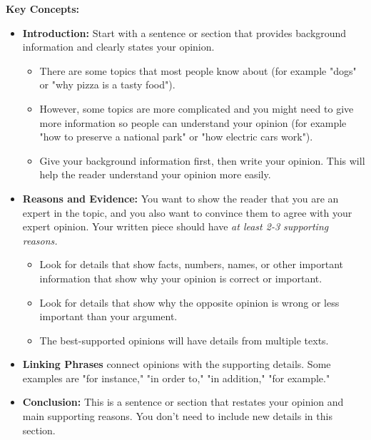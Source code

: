 \documentclass[12pt]{article}
\begin{document}
\begin{tcolorbox}[colframe=black!60, colback=white, 
coltitle=black, colbacktitle=black!15, fonttitle=\bfseries\Large, 
title=Key Concepts and Vocabulary, halign title=center, left=10pt, right=10pt, top=10pt, bottom=5pt]
\textbf{Key Concepts:}
\begin{itemize}
    \item \textbf{Introduction:} Start with a sentence or section that provides background information and clearly states your opinion.
    \begin{itemize}
        \item There are some topics that most people know about (for example "dogs" or "why pizza is a tasty food").   
        \item However, some topics are more complicated and you might need to give more information so people can understand your opinion (for example "how to preserve a national park" or "how electric cars work").
        \item Give your background information first, then write your opinion. This will help the reader understand your opinion more easily.
    \end{itemize}

    \item \textbf{Reasons and Evidence:} You want to show the reader that you are an expert in the topic, and you also want to convince them to agree with your expert opinion. Your written piece should have \textit{at least 2-3 supporting reasons.}
    \begin{itemize}
        \item Look for details that show facts, numbers, names, or other important information that show why your opinion is correct or important.
        \item Look for details that show why the opposite opinion is wrong or less important than your argument.
        \item The best-supported opinions will have details from multiple texts.
    \end{itemize}
    \item \textbf{Linking Phrases} connect opinions with the supporting details. Some examples are "for instance," "in order to," "in addition," "for example."
    \item \textbf{Conclusion:} This is a sentence or section that restates your opinion and main supporting reasons. You don't need to include new details in this section.
    \end{itemize}
\end{tcolorbox}
\end{document}
